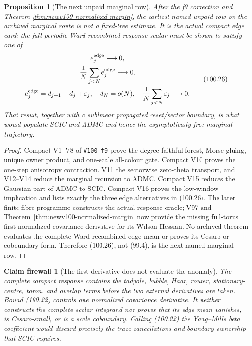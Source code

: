 \documentclass[11pt,oneside]{article}
\newtheorem{proposition}[theorem]{Proposition}
\newtheorem{firewall}[theorem]{Claim firewall}
\theoremstyle{definition}
\theoremstyle{remark}
\begin{document}
\begin{proposition}[The next unpaid marginal row]
\label{prop:newv100-next-row}
After the f9 correction and Theorem
\ref{thm:newv100-normalized-margin}, the earliest named unpaid row
on the archived marginal route is not a fixed-tree estimate.  It is
the actual compact edge card: the full periodic Ward-recombined
response scalar must be shown to satisfy one of
\[
\begin{gathered}
 e_j^{\rm edge}\longrightarrow0,\\
 \frac1N\sum_{j<N}e_j^{\rm edge}\longrightarrow0,\\
 e_j^{\rm edge}=d_{j+1}-d_j+\varepsilon_j,\quad
 d_N=o(N),\quad
 \frac1N\sum_{j<N}\varepsilon_j\longrightarrow0.
\end{gathered}                                             \tag{100.26}
\]
That result, together with a sublinear propagated reset/sector
boundary, is what would populate SCIC and ADMC and hence the
asymptotically free marginal trajectory.
\end{proposition}

\begin{proof}
Compact V1--V8 of \texttt{V100\_f9} prove the degree-faithful
forest, Morse gluing, unique owner product, and one-scale all-colour
gate.  Compact V10 proves the one-step anisotropy contraction, V11
the sectorwise zero-theta transport, and V12--V14 reduce the
marginal recursion to ADMC.  Compact V15 reduces the Gaussian part
of ADMC to SCIC.  Compact V16 proves the low-window implication and
lists exactly the three edge alternatives in (100.26).  The later
finite-fibre programme constructs the actual response oracle; V97
and Theorem~\ref{thm:newv100-normalized-margin} now provide the
missing full-torus first normalized covariance derivative for its
Wilson Hessian.  No archived theorem evaluates the complete
Ward-recombined edge mean or proves its Cesaro or coboundary form.
Therefore (100.26), not (99.4), is the next named marginal row.
\end{proof}

\begin{firewall}[The first derivative does not evaluate the anomaly]
\label{fire:newv100-no-anomaly}
The complete compact response contains the tadpole, bubble, Haar,
router, stationary-centre, toron, and overlap terms before the two
external derivatives are taken.  Bound (100.22) controls one
normalized covariance derivative.  It neither constructs the
complete scalar integrand nor proves that its edge mean vanishes,
is Cesaro-small, or is a scale coboundary.  Calling (100.22) the
Yang--Mills beta coefficient would discard precisely the trace
cancellations and boundary ownership that SCIC requires.
\end{firewall}
\end{document}
